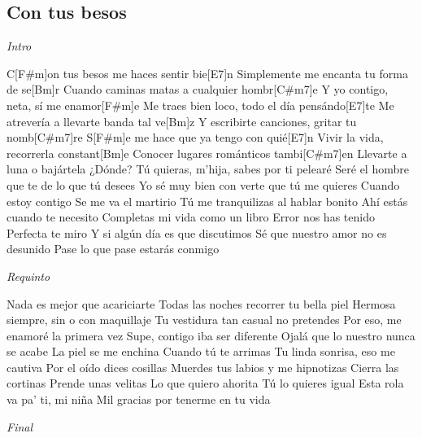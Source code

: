 \subsection{Con tus besos}
\noindent

\vspace{1cm}

\begin{guitar}
	\begin{multicols}{2}
		\textit{Intro}
		\par

		C[F#m]on tus besos me haces sentir bie[E7]n
		Simplemente me encanta tu forma de se[Bm]r
		Cuando caminas matas a cualquier hombr[C#m7]e
		Y yo contigo, neta, sí me enamor[F#m]e
		Me traes bien loco, todo el día pensándo[E7]te
		Me atrevería a llevarte banda tal ve[Bm]z
		Y escribirte canciones, gritar tu nomb[C#m7]re
		S[F#m]e me hace que ya tengo con quié[E7]n
		Vivir la vida, recorrerla constant[Bm]e
		Conocer lugares románticos tambi[C#m7]en
		Llevarte a luna o bajártela ¿Dónde?
		Tú quieras, m'hija, sabes por ti pelearé
		Seré el hombre que te de lo que tú desees
		Yo sé muy bien con verte que tú me quieres
		Cuando estoy contigo
		Se me va el martirio
		Tú me tranquilizas al hablar bonito
		Ahí estás cuando te necesito
		Completas mi vida como un libro
		Error nos has tenido
		Perfecta te miro
		Y si algún día es que discutimos
		Sé que nuestro amor no es desunido
		Pase lo que pase estarás conmigo

		\par
		\textit{Requinto}
		\par

		Nada es mejor que acariciarte
		Todas las noches recorrer tu bella piel
		Hermosa siempre, sin o con maquillaje
		Tu vestidura tan casual no pretendes
		Por eso, me enamoré la primera vez
		Supe, contigo iba ser diferente
		Ojalá que lo nuestro nunca se acabe
		La piel se me enchina
		Cuando tú te arrimas
		Tu linda sonrisa, eso me cautiva
		Por el oído dices cosillas
		Muerdes tus labios y me hipnotizas
		Cierra las cortinas
		Prende unas velitas
		Lo que quiero ahorita
		Tú lo quieres igual
		Esta rola va pa' ti, mi niña
		Mil gracias por tenerme en tu vida

		\par
		\textit{Final}


	\end{multicols}
\end{guitar}
